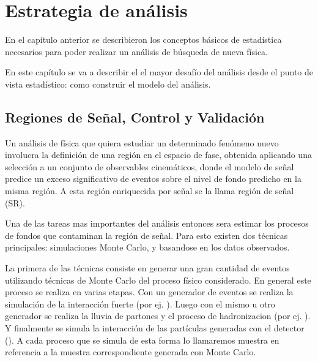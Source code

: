 \chapter{Estrategia de análisis}

En el capítulo anterior se describieron los conceptos básicos de
estadística necesarios para poder realizar un análisis de búsqueda
de nueva física.




En este capítulo se va a describir el el mayor
desafío del análisis desde el punto de vista estadístico: como
construir el modelo del análisis.


\section{Regiones de Señal, Control y Validación}
Un análisis de física que quiera estudiar un determinado fenómeno nuevo involucra
la definición de una región en el espacio de fase, obtenida aplicando una selección
a un conjunto de observables cinemáticos, donde el modelo de señal predice un exceso
significativo de eventos sobre el nivel de fondo predicho en la misma región. A esta
región enriquecida por señal se la llama región de señal (SR).

Una de las tareas mas importantes del análisis entonces sera estimar los procesos
de fondos que contaminan la región de señal. Para esto existen dos técnicas principales:
simulaciones Monte Carlo, y basandose en los datos observados.

La primera de las técnicas consiste en generar una gran cantidad de eventos utilizando técnicas
de Monte Carlo del proceso físico considerado. En general este proceso se realiza en varias etapas.
Con un generador de eventos se realiza la simulación de la interacción fuerte (por ej.
{\madgraph}). Luego con el mismo u otro generador se realiza la lluvia de partones y el
proceso de hadronizacion (por ej. {\pythia}). Y finalmente se simula la interacción de las
partículas generadas con el detector ({\geant}). A cada proceso que se simula de esta forma
lo llamaremos muestra en referencia a la muestra correspondiente generada con Monte Carlo.

